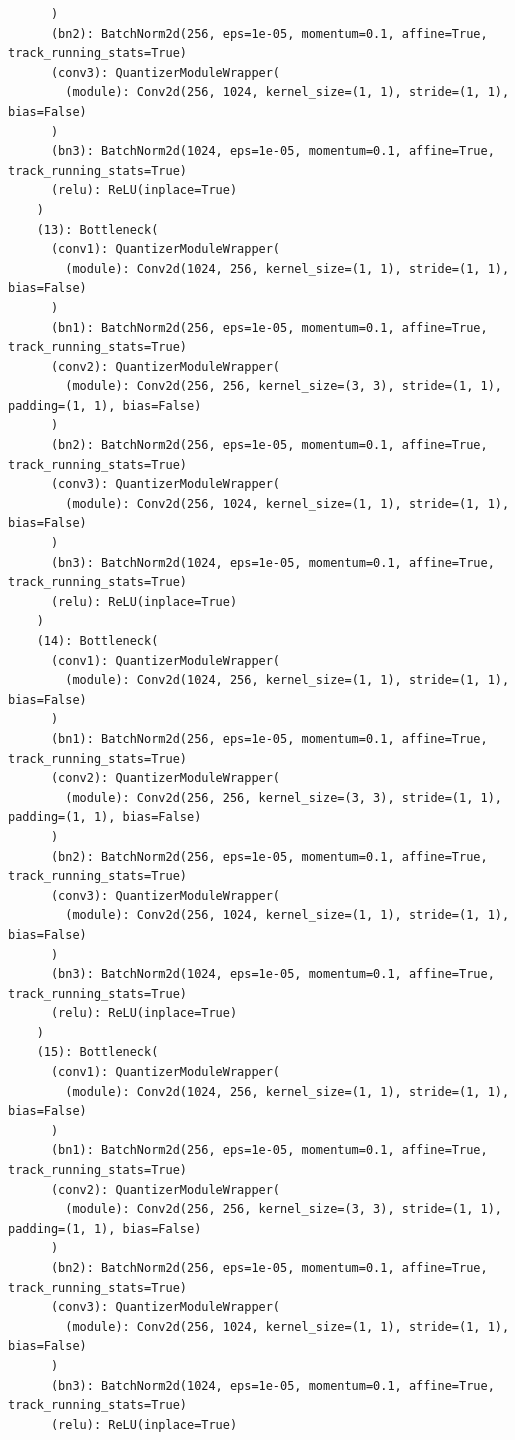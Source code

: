 \documentclass{article}
\begin{document}
\begin{verbatim}
      )
      (bn2): BatchNorm2d(256, eps=1e-05, momentum=0.1, affine=True, track_running_stats=True)
      (conv3): QuantizerModuleWrapper(
        (module): Conv2d(256, 1024, kernel_size=(1, 1), stride=(1, 1), bias=False)
      )
      (bn3): BatchNorm2d(1024, eps=1e-05, momentum=0.1, affine=True, track_running_stats=True)
      (relu): ReLU(inplace=True)
    )
    (13): Bottleneck(
      (conv1): QuantizerModuleWrapper(
        (module): Conv2d(1024, 256, kernel_size=(1, 1), stride=(1, 1), bias=False)
      )
      (bn1): BatchNorm2d(256, eps=1e-05, momentum=0.1, affine=True, track_running_stats=True)
      (conv2): QuantizerModuleWrapper(
        (module): Conv2d(256, 256, kernel_size=(3, 3), stride=(1, 1), padding=(1, 1), bias=False)
      )
      (bn2): BatchNorm2d(256, eps=1e-05, momentum=0.1, affine=True, track_running_stats=True)
      (conv3): QuantizerModuleWrapper(
        (module): Conv2d(256, 1024, kernel_size=(1, 1), stride=(1, 1), bias=False)
      )
      (bn3): BatchNorm2d(1024, eps=1e-05, momentum=0.1, affine=True, track_running_stats=True)
      (relu): ReLU(inplace=True)
    )
    (14): Bottleneck(
      (conv1): QuantizerModuleWrapper(
        (module): Conv2d(1024, 256, kernel_size=(1, 1), stride=(1, 1), bias=False)
      )
      (bn1): BatchNorm2d(256, eps=1e-05, momentum=0.1, affine=True, track_running_stats=True)
      (conv2): QuantizerModuleWrapper(
        (module): Conv2d(256, 256, kernel_size=(3, 3), stride=(1, 1), padding=(1, 1), bias=False)
      )
      (bn2): BatchNorm2d(256, eps=1e-05, momentum=0.1, affine=True, track_running_stats=True)
      (conv3): QuantizerModuleWrapper(
        (module): Conv2d(256, 1024, kernel_size=(1, 1), stride=(1, 1), bias=False)
      )
      (bn3): BatchNorm2d(1024, eps=1e-05, momentum=0.1, affine=True, track_running_stats=True)
      (relu): ReLU(inplace=True)
    )
    (15): Bottleneck(
      (conv1): QuantizerModuleWrapper(
        (module): Conv2d(1024, 256, kernel_size=(1, 1), stride=(1, 1), bias=False)
      )
      (bn1): BatchNorm2d(256, eps=1e-05, momentum=0.1, affine=True, track_running_stats=True)
      (conv2): QuantizerModuleWrapper(
        (module): Conv2d(256, 256, kernel_size=(3, 3), stride=(1, 1), padding=(1, 1), bias=False)
      )
      (bn2): BatchNorm2d(256, eps=1e-05, momentum=0.1, affine=True, track_running_stats=True)
      (conv3): QuantizerModuleWrapper(
        (module): Conv2d(256, 1024, kernel_size=(1, 1), stride=(1, 1), bias=False)
      )
      (bn3): BatchNorm2d(1024, eps=1e-05, momentum=0.1, affine=True, track_running_stats=True)
      (relu): ReLU(inplace=True)

\end{verbatim}
\end{document}
